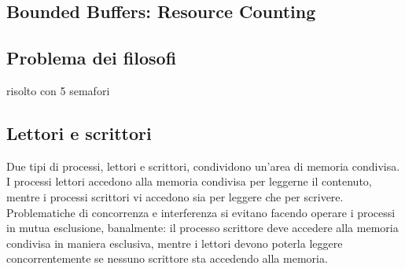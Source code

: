 \documentclass[10pt,a4paper]{article}
\begin{document}
\subsection{Bounded Buffers: Resource Counting}




\subsection{Problema dei filosofi}
risolto con 5 semafori


\subsection{Lettori e scrittori}
Due tipi di processi, lettori e scrittori, condividono un'area di memoria condivisa. I processi lettori accedono alla memoria condivisa per leggerne il contenuto, mentre i processi scrittori vi accedono sia per leggere che per scrivere.
Problematiche di concorrenza e interferenza si evitano facendo operare i processi in mutua esclusione, banalmente: il processo scrittore deve accedere alla memoria condivisa in maniera esclusiva, mentre i lettori devono poterla leggere concorrentemente se nessuno scrittore sta accedendo alla memoria.
\end{document}
